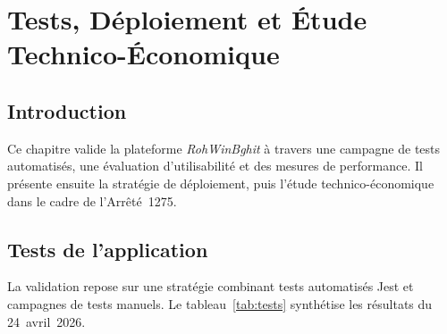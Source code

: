 \chapter{Tests, Déploiement et Étude Technico-Économique}
\label{chap:tests-deploiement}

\section{Introduction}
Ce chapitre valide la plateforme \textit{RohWinBghit} à travers une campagne de tests automatisés, une évaluation d'utilisabilité et des mesures de performance. Il présente ensuite la stratégie de déploiement, puis l'étude technico-économique dans le cadre de l'Arrêté~1275.


\section{Tests de l'application}
\label{sec:tests-app}

La validation repose sur une stratégie combinant tests automatisés Jest et campagnes de tests manuels. Le tableau~\ref{tab:tests} synthétise les résultats du 24~avril~2026.

